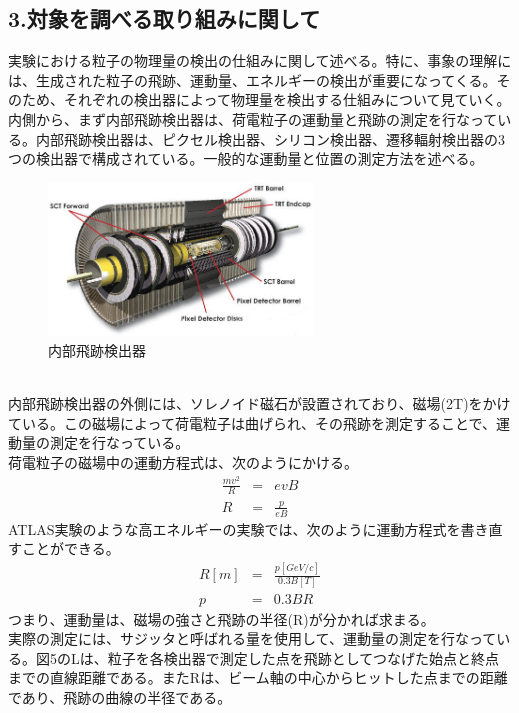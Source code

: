 \documentclass{jreport}
\begin{document}
\subsection*{3.対象を調べる取り組みに関して}
\noindent
実験における粒子の物理量の検出の仕組みに関して述べる。特に、事象の理解には、生成された粒子の飛跡、運動量、エネルギーの検出が重要になってくる。そのため、それぞれの検出器によって物理量を検出する仕組みについて見ていく。\\
内側から、まず内部飛跡検出器は、荷電粒子の運動量と飛跡の測定を行なっている。内部飛跡検出器は、ピクセル検出器、シリコン検出器、遷移輻射検出器の3つの検出器で構成されている。一般的な運動量と位置の測定方法を述べる。\\
\begin{figure}[htbp]
	\begin{center}
	\includegraphics[width=70mm]{image4.jpg}
	\end{center}
	\caption{内部飛跡検出器}
	\label{fig:four}
\end{figure}
\\
内部飛跡検出器の外側には、ソレノイド磁石が設置されており、磁場(2T)をかけている。この磁場によって荷電粒子は曲げられ、その飛跡を測定することで、運動量の測定を行なっている。\\
荷電粒子の磁場中の運動方程式は、次のようにかける。\\
\begin{eqnarray}
\frac{mv^2}{R} &=& evB \\
R &=& \frac{p}{eB}
\end{eqnarray}
ATLAS実験のような高エネルギーの実験では、次のように運動方程式を書き直すことができる。
\begin{eqnarray}
R[m] &=& \frac{p[GeV/c]}{0.3 B[T]} \\
p &=& 0.3 B R
\end{eqnarray}
つまり、運動量は、磁場の強さと飛跡の半径(R)が分かれば求まる。\\
実際の測定には、サジッタと呼ばれる量を使用して、運動量の測定を行なっている。図5のLは、粒子を各検出器で測定した点を飛跡としてつなげた始点と終点までの直線距離である。またRは、ビーム軸の中心からヒットした点までの距離であり、飛跡の曲線の半径である。\\
\end{document}
